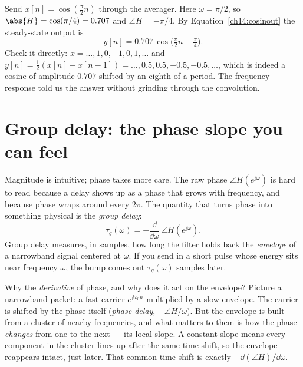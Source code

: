 \begin{example}
\label{ch14:ex-handpredict}
Send $x[n] = \cos(\tfrac{\pi}{2} n)$ through the averager. Here $\omega=\pi/2$,
so $\abs{H}=\cos(\pi/4)=0.707$ and $\angle H = -\pi/4$. By
Equation~\eqref{ch14:cosinout} the steady-state output is
\[
  y[n] = 0.707\,\cos\!\big(\tfrac{\pi}{2}n - \tfrac{\pi}{4}\big).
\]
Check it directly: $x = \dots,1,0,-1,0,1,\dots$ and
$y[n]=\tfrac12(x[n]+x[n-1]) = \dots, 0.5, 0.5, -0.5, -0.5, \dots$, which is
indeed a cosine of amplitude $0.707$ shifted by an eighth of a period. The
frequency response told us the answer without grinding through the convolution.
\end{example}

\section{Group delay: the phase slope you can feel}
\label{ch14:groupdelay}

Magnitude is intuitive; phase takes more care. The raw phase
$\angle H(e^{\jj\omega})$ is hard to read because a delay shows up as a phase
that grows with frequency, and because phase wraps around every $2\pi$. The
quantity that turns phase into something physical is the \emph{group delay}:
\begin{equation}
  \tau_g(\omega) = -\frac{\dd}{\dd\omega}\,\angle H(e^{\jj\omega}).
  \label{ch14:gd}
\end{equation}
Group delay measures, in samples, how long the filter holds back the
\emph{envelope} of a narrowband signal centered at $\omega$. If you send in a
short pulse whose energy sits near frequency $\omega$, the bump comes out
$\tau_g(\omega)$ samples later.

\begin{whybox}
Why the \emph{derivative} of phase, and why does it act on the envelope? Picture
a narrowband packet: a fast carrier $e^{\jj\omega_0 n}$ multiplied by a slow
envelope. The carrier is shifted by the phase itself (\emph{phase delay},
$-\angle H/\omega$). But the envelope is built from a cluster of nearby
frequencies, and what matters to them is how the phase \emph{changes} from one
to the next --- its local slope. A constant slope means every component in the
cluster lines up after the same time shift, so the envelope reappears intact,
just later. That common time shift is exactly $-\dd(\angle H)/\dd\omega$.
\end{whybox}

